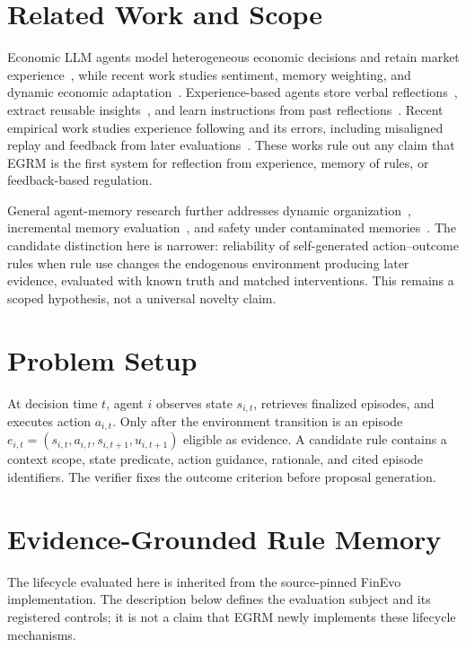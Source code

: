 \documentclass[sigconf,anonymous,review]{acmart}
\begin{document}
\section{Related Work and Scope}
Economic LLM agents model heterogeneous economic decisions and retain market
experience~\cite{li2024econagent}, while recent work studies
sentiment, memory weighting, and dynamic economic adaptation~\cite{liu2026econai}.
Experience-based agents store verbal reflections~\cite{shinn2023reflexion},
extract reusable insights~\cite{zhao2024expel}, and learn instructions from
past reflections~\cite{gupta2024metareflection}. Recent empirical work studies
experience following and its errors, including misaligned replay and feedback
from later evaluations~\cite{xiong2026memory}. These works rule out any claim
that EGRM is the first system for reflection from experience, memory of rules,
or feedback-based regulation.

General agent-memory research further addresses dynamic
organization~\cite{xu2025amem}, incremental memory
evaluation~\cite{hu2025memoryagentbench}, and safety under contaminated
memories~\cite{wei2025amemguard,xie2026memevobench}. The candidate distinction
here is narrower: reliability of self-generated action--outcome rules when rule
use changes the endogenous environment producing later evidence, evaluated
with known truth and matched interventions. This remains a scoped hypothesis,
not a universal novelty claim.

\section{Problem Setup}
At decision time $t$, agent $i$ observes state $s_{i,t}$, retrieves finalized
episodes, and executes action $a_{i,t}$. Only after the environment transition
is an episode $e_{i,t}=(s_{i,t},a_{i,t},s_{i,t+1},u_{i,t+1})$ eligible as
evidence. A candidate rule contains a context scope, state predicate, action
guidance, rationale, and cited episode identifiers. The verifier fixes the
outcome criterion before proposal generation.

\section{Evidence-Grounded Rule Memory}
The lifecycle evaluated here is inherited from the source-pinned FinEvo
implementation. The description below defines the evaluation subject and its
registered controls; it is not a claim that EGRM newly implements these
lifecycle mechanisms.
\end{document}
